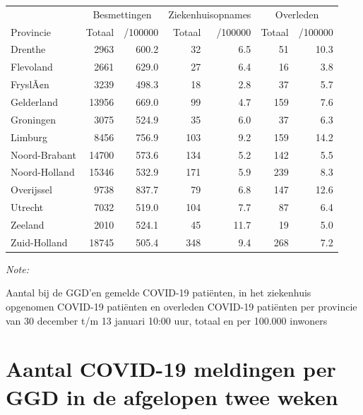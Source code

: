 \documentclass[
  english,
  man,floatsintext]{apa6}
\begin{document}
\begin{table}[H]
\centering
\begin{threeparttable}
\begin{tabular}{lrrrrrr}
\toprule
\multicolumn{1}{c}{ } & \multicolumn{2}{c}{Besmettingen} & \multicolumn{2}{c}{Ziekenhuisopnames} & \multicolumn{2}{c}{Overleden} \\
\cmidrule(l{3pt}r{3pt}){2-3} \cmidrule(l{3pt}r{3pt}){4-5} \cmidrule(l{3pt}r{3pt}){6-7}
Provincie & Totaal & /100000 & Totaal & /100000 & Totaal & /100000\\
\midrule
Drenthe & 2963 & 600.2 & 32 & 6.5 & 51 & 10.3\\
Flevoland & 2661 & 629.0 & 27 & 6.4 & 16 & 3.8\\
FryslÃ¢n & 3239 & 498.3 & 18 & 2.8 & 37 & 5.7\\
Gelderland & 13956 & 669.0 & 99 & 4.7 & 159 & 7.6\\
Groningen & 3075 & 524.9 & 35 & 6.0 & 37 & 6.3\\
Limburg & 8456 & 756.9 & 103 & 9.2 & 159 & 14.2\\
Noord-Brabant & 14700 & 573.6 & 134 & 5.2 & 142 & 5.5\\
Noord-Holland & 15346 & 532.9 & 171 & 5.9 & 239 & 8.3\\
Overijssel & 9738 & 837.7 & 79 & 6.8 & 147 & 12.6\\
Utrecht & 7032 & 519.0 & 104 & 7.7 & 87 & 6.4\\
Zeeland & 2010 & 524.1 & 45 & 11.7 & 19 & 5.0\\
Zuid-Holland & 18745 & 505.4 & 348 & 9.4 & 268 & 7.2\\
\bottomrule
\end{tabular}
\begin{tablenotes}
\item \textit{Note: } 
\item Aantal bij de GGD’en gemelde COVID-19 patiënten, in het ziekenhuis opgenomen COVID-19 patiënten en overleden COVID-19 patiënten per provincie van 30 december t/m 13 januari 10:00 uur, totaal en per 100.000 inwoners
\end{tablenotes}
\end{threeparttable}
\end{table}

\newpage

\hypertarget{aantal-covid-19-meldingen-per-ggd-in-de-afgelopen-twee-weken}{%
\section{Aantal COVID-19 meldingen per GGD in de afgelopen twee weken}\label{aantal-covid-19-meldingen-per-ggd-in-de-afgelopen-twee-weken}}
\end{document}
